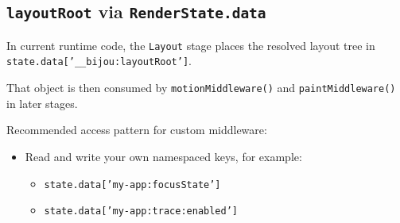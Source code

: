 \subsection{\texorpdfstring{\texttt{l\allowbreak{}a\allowbreak{}y\allowbreak{}o\allowbreak{}u\allowbreak{}t\allowbreak{}R\allowbreak{}o\allowbreak{}o\allowbreak{}t} via \texttt{R\allowbreak{}e\allowbreak{}n\allowbreak{}d\allowbreak{}e\allowbreak{}r\allowbreak{}S\allowbreak{}t\allowbreak{}a\allowbreak{}t\allowbreak{}e\allowbreak{}.\allowbreak{}d\allowbreak{}a\allowbreak{}t\allowbreak{}a}}{ via }}\label{record-014-layoutroot-via-renderstate.data}

In current runtime code, the \texttt{L\allowbreak{}a\allowbreak{}y\allowbreak{}o\allowbreak{}u\allowbreak{}t} stage places the resolved layout tree in \texttt{s\allowbreak{}t\allowbreak{}a\allowbreak{}t\allowbreak{}e\allowbreak{}.\allowbreak{}d\allowbreak{}a\allowbreak{}t\allowbreak{}a\allowbreak{}[\allowbreak{}'\allowbreak{}\_\allowbreak{}\_\allowbreak{}b\allowbreak{}i\allowbreak{}j\allowbreak{}o\allowbreak{}u\allowbreak{}:\allowbreak{}l\allowbreak{}a\allowbreak{}y\allowbreak{}o\allowbreak{}u\allowbreak{}t\allowbreak{}R\allowbreak{}o\allowbreak{}o\allowbreak{}t\allowbreak{}'\allowbreak{}]}.

That object is then consumed by \texttt{m\allowbreak{}o\allowbreak{}t\allowbreak{}i\allowbreak{}o\allowbreak{}n\allowbreak{}M\allowbreak{}i\allowbreak{}d\allowbreak{}d\allowbreak{}l\allowbreak{}e\allowbreak{}w\allowbreak{}a\allowbreak{}r\allowbreak{}e\allowbreak{}(\allowbreak{})} and \texttt{p\allowbreak{}a\allowbreak{}i\allowbreak{}n\allowbreak{}t\allowbreak{}M\allowbreak{}i\allowbreak{}d\allowbreak{}d\allowbreak{}l\allowbreak{}e\allowbreak{}w\allowbreak{}a\allowbreak{}r\allowbreak{}e\allowbreak{}(\allowbreak{})} in later stages.

Recommended access pattern for custom middleware:

\begin{itemize}
\tightlist
\item
  Read and write your own namespaced keys, for example:

  \begin{itemize}
  \tightlist
  \item
    \texttt{s\allowbreak{}t\allowbreak{}a\allowbreak{}t\allowbreak{}e\allowbreak{}.\allowbreak{}d\allowbreak{}a\allowbreak{}t\allowbreak{}a\allowbreak{}[\allowbreak{}'\allowbreak{}m\allowbreak{}y\allowbreak{}-\allowbreak{}a\allowbreak{}p\allowbreak{}p\allowbreak{}:\allowbreak{}f\allowbreak{}o\allowbreak{}c\allowbreak{}u\allowbreak{}s\allowbreak{}S\allowbreak{}t\allowbreak{}a\allowbreak{}t\allowbreak{}e\allowbreak{}'\allowbreak{}]}
  \item
    \texttt{s\allowbreak{}t\allowbreak{}a\allowbreak{}t\allowbreak{}e\allowbreak{}.\allowbreak{}d\allowbreak{}a\allowbreak{}t\allowbreak{}a\allowbreak{}[\allowbreak{}'\allowbreak{}m\allowbreak{}y\allowbreak{}-\allowbreak{}a\allowbreak{}p\allowbreak{}p\allowbreak{}:\allowbreak{}t\allowbreak{}r\allowbreak{}a\allowbreak{}c\allowbreak{}e\allowbreak{}:\allowbreak{}e\allowbreak{}n\allowbreak{}a\allowbreak{}b\allowbreak{}l\allowbreak{}e\allowbreak{}d\allowbreak{}'\allowbreak{}]}
  \end{itemize}
\end{itemize}

